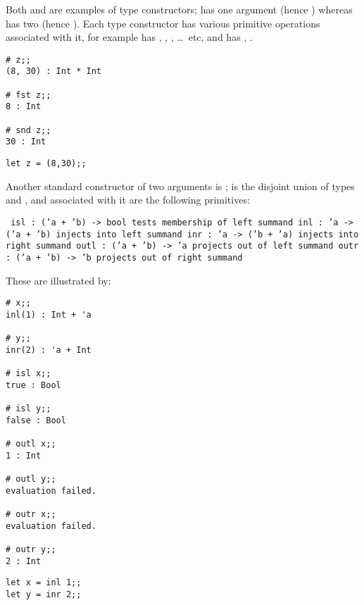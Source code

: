 \documentclass[11pt]{article}
\begin{document}
Both  and \ttQ{*} are examples of type constructors;  has one argument (hence )
whereas \ttQ{*} has two (hence ).  Each type constructor has
various primitive operations associated with it, for example  has
, , , \ldots\ etc, and \ttQ{*} has ,
.

\begin{session}
\emlsession
\begin{verbatim}
# z;;
(8, 30) : Int * Int

# fst z;;
8 : Int

# snd z;;
30 : Int
\end{verbatim}
\emlfile
\begin{verbatim}
let z = (8,30);;
\end{verbatim}
\emlend
\end{session}


Another standard constructor of two arguments is \TTD{+};
 is the disjoint union of types  and , and associated with it are the following
primitives:

\bt\normalsize\tt
\e   isl  : ('a + 'b) -> bool    {\rm  tests membership of left summand}
\e   inl  : 'a -> ('a + 'b)      {\rm  injects into left summand}
\e   inr  : 'a -> ('b + 'a)      {\rm  injects into right summand}
\e   outl : ('a + 'b) -> 'a      {\rm  projects out of left summand}
\e   outr : ('a + 'b) -> 'b      {\rm  projects out of right summand}
\et

\noindent These are illustrated by:

\begin{session}
\emlsession
\begin{verbatim}
# x;;
inl(1) : Int + 'a

# y;;
inr(2) : 'a + Int

# isl x;;
true : Bool

# isl y;;
false : Bool

# outl x;;
1 : Int

# outl y;;
evaluation failed.

# outr x;;
evaluation failed.

# outr y;;
2 : Int
\end{verbatim}
\emlfile
\begin{verbatim}
let x = inl 1;;
let y = inr 2;;
\end{verbatim}
\emlend
\end{session}
\end{document}
